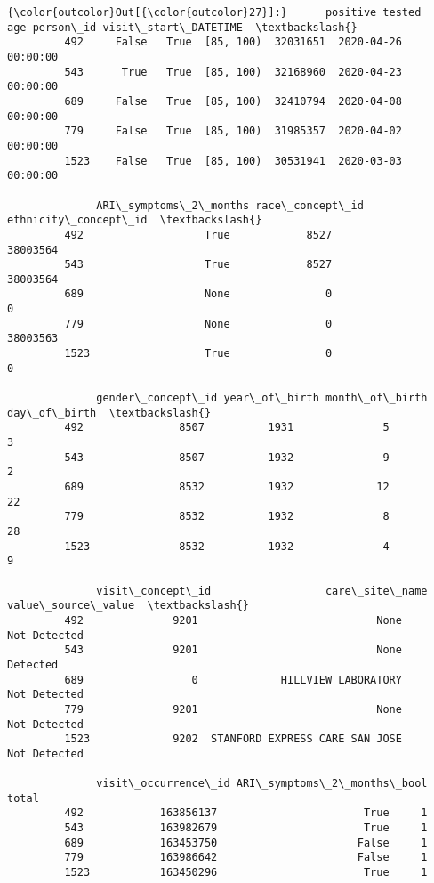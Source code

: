 \documentclass[11pt]{article}
\begin{document}
\begin{Verbatim}[commandchars=\\\{\}]
{\color{outcolor}Out[{\color{outcolor}27}]:}      positive tested        age person\_id visit\_start\_DATETIME  \textbackslash{}
         492     False   True  [85, 100)  32031651  2020-04-26 00:00:00   
         543      True   True  [85, 100)  32168960  2020-04-23 00:00:00   
         689     False   True  [85, 100)  32410794  2020-04-08 00:00:00   
         779     False   True  [85, 100)  31985357  2020-04-02 00:00:00   
         1523    False   True  [85, 100)  30531941  2020-03-03 00:00:00   
         
              ARI\_symptoms\_2\_months race\_concept\_id ethnicity\_concept\_id  \textbackslash{}
         492                   True            8527             38003564   
         543                   True            8527             38003564   
         689                   None               0                    0   
         779                   None               0             38003563   
         1523                  True               0                    0   
         
              gender\_concept\_id year\_of\_birth month\_of\_birth day\_of\_birth  \textbackslash{}
         492               8507          1931              5            3   
         543               8507          1932              9            2   
         689               8532          1932             12           22   
         779               8532          1932              8           28   
         1523              8532          1932              4            9   
         
              visit\_concept\_id                  care\_site\_name value\_source\_value  \textbackslash{}
         492              9201                            None       Not Detected   
         543              9201                            None           Detected   
         689                 0             HILLVIEW LABORATORY       Not Detected   
         779              9201                            None       Not Detected   
         1523             9202  STANFORD EXPRESS CARE SAN JOSE       Not Detected   
         
              visit\_occurrence\_id ARI\_symptoms\_2\_months\_bool total  
         492            163856137                       True     1  
         543            163982679                       True     1  
         689            163453750                      False     1  
         779            163986642                      False     1  
         1523           163450296                       True     1  
\end{Verbatim}
            
\end{document}
